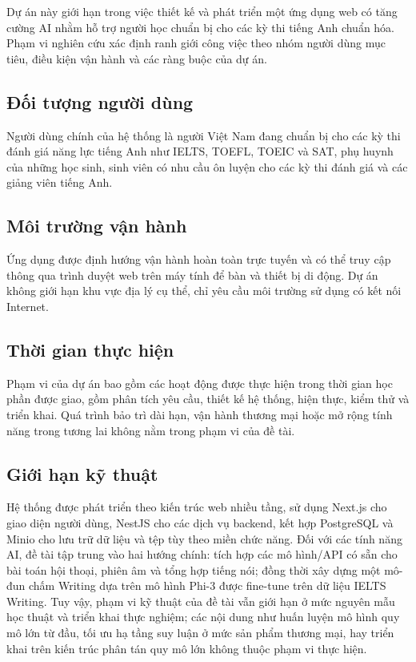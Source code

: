 Dự án này giới hạn trong việc thiết kế và phát triển một ứng dụng web có tăng cường AI nhằm hỗ trợ người học chuẩn bị cho các kỳ thi tiếng Anh chuẩn hóa. Phạm vi nghiên cứu xác định ranh giới công việc theo nhóm người dùng mục tiêu, điều kiện vận hành và các ràng buộc của dự án.

\subsection{Đối tượng người dùng}

Người dùng chính của hệ thống là người Việt Nam đang chuẩn bị cho các kỳ thi đánh giá năng lực tiếng Anh như IELTS, TOEFL, TOEIC và SAT, phụ huynh của những học sinh, sinh viên có nhu cầu ôn luyện cho các kỳ thi đánh giá và các giảng viên tiếng Anh.

\subsection{Môi trường vận hành}

Ứng dụng được định hướng vận hành hoàn toàn trực tuyến và có thể truy cập thông qua trình duyệt web trên máy tính để bàn và thiết bị di động. Dự án không giới hạn khu vực địa lý cụ thể, chỉ yêu cầu môi trường sử dụng có kết nối Internet.

\subsection{Thời gian thực hiện}

Phạm vi của dự án bao gồm các hoạt động được thực hiện trong thời gian học phần được giao, gồm phân tích yêu cầu, thiết kế hệ thống, hiện thực, kiểm thử và triển khai. Quá trình bảo trì dài hạn, vận hành thương mại hoặc mở rộng tính năng trong tương lai không nằm trong phạm vi của đề tài.

\subsection{Giới hạn kỹ thuật}

Hệ thống được phát triển theo kiến trúc web nhiều tầng, sử dụng Next.js \cite{nextjs_docs} cho giao diện người dùng, NestJS \cite{nestjs} cho các dịch vụ backend, kết hợp PostgreSQL \cite{postgresql} và Minio \cite{minio} cho lưu trữ dữ liệu và tệp tùy theo miền chức năng. Đối với các tính năng AI, đề tài tập trung vào hai hướng chính: tích hợp các mô hình/API có sẵn cho bài toán hội thoại, phiên âm và tổng hợp tiếng nói; đồng thời xây dựng một mô-đun chấm Writing dựa trên mô hình Phi-3 được fine-tune trên dữ liệu IELTS Writing. Tuy vậy, phạm vi kỹ thuật của đề tài vẫn giới hạn ở mức nguyên mẫu học thuật và triển khai thực nghiệm; các nội dung như huấn luyện mô hình quy mô lớn từ đầu, tối ưu hạ tầng suy luận ở mức sản phẩm thương mại, hay triển khai trên kiến trúc phân tán quy mô lớn không thuộc phạm vi thực hiện.

